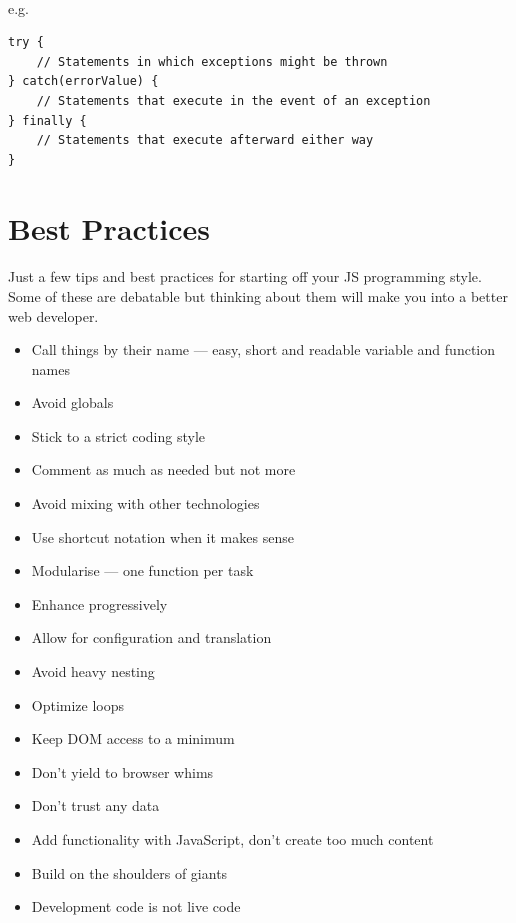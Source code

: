 \paragraph{} e.g.

\begin{lstlisting}
try {
  	// Statements in which exceptions might be thrown
} catch(errorValue) {
  	// Statements that execute in the event of an exception
} finally {
  	// Statements that execute afterward either way
}
\end{lstlisting}

\section{Best Practices}
\paragraph{} Just a few tips and best practices for starting off your JS programming style. Some of these are debatable but thinking about them will make you into a better web developer.

\begin{itemize}
\item Call things by their name — easy, short and readable variable and function names
\item Avoid globals
\item Stick to a strict coding style
\item Comment as much as needed but not more
\item Avoid mixing with other technologies
\item Use shortcut notation when it makes sense
\item Modularise — one function per task
\item Enhance progressively
\item Allow for configuration and translation
\item Avoid heavy nesting
\item Optimize loops
\item Keep DOM access to a minimum
\item Don’t yield to browser whims
\item Don’t trust any data
\item Add functionality with JavaScript, don’t create too much content
\item Build on the shoulders of giants
\item Development code is not live code
\end{itemize}

